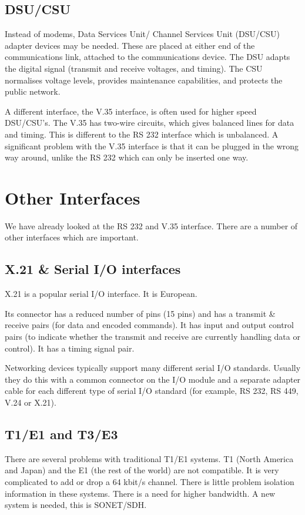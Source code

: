 \subsection*{DSU/CSU}
Instead of modems, Data Services Unit/ Channel Services Unit (DSU/CSU) adapter devices may be needed. These are placed at either end of the communications link, attached to the communications device. The DSU adapts the digital signal (transmit and receive voltages, and timing). The CSU normalises voltage levels, provides maintenance capabilities, and protects the public network. 

A different interface, the V.35 interface, is often used for higher speed DSU/CSU's. The V.35 has two-wire circuits, which gives balanced lines for data and timing. This is different to the RS 232 interface which is unbalanced. A significant problem with the V.35 interface is that it can be plugged in the wrong way around, unlike the RS 232 which can only be inserted one way.

\section*{Other Interfaces}
We have already looked at the RS 232 and V.35 interface. There are a number of other interfaces which are important.
\subsection*{X.21 \& Serial I/O interfaces}
X.21 is a popular serial I/O interface. It is European.

Its connector has a reduced number of pins (15 pins) and has a transmit \& receive pairs (for data and encoded commands). It has input and output control pairs (to indicate whether the transmit and receive are currently handling data or control). It has a timing signal pair. 

Networking devices typically support many different serial I/O standards. Usually they do this with a common connector on the I/O module and a separate adapter cable for each different type of serial I/O standard (for example, RS 232, RS 449, V.24 or X.21). 

\subsection*{T1/E1 and T3/E3}
There are several problems with traditional T1/E1 systems. T1 (North America and Japan) and the E1 (the rest of the world) are not compatible. It is very complicated to add or drop a 64 kbit/s channel. There is little problem isolation information in these systems. There is a need for higher bandwidth. A new system is needed, this is SONET/SDH.

